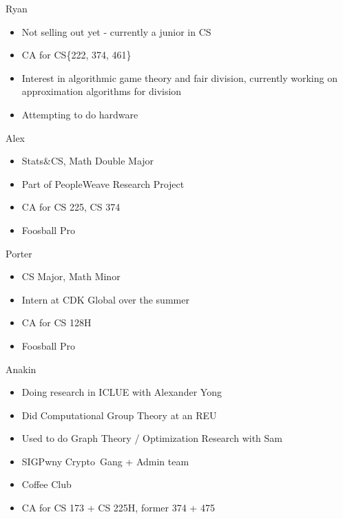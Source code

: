 \documentclass[aspectratio=169]{beamer}
\begin{document}
\begin{frame}{Ryan}
    \begin{itemize}
    \item Not selling out yet - currently a junior in CS
    \item CA for CS\{222, 374, 461\}
    \item Interest in algorithmic game theory and fair division, currently working on approximation algorithms for division
    \item Attempting to do hardware
    \end{itemize} 
\end{frame}

\begin{frame}{Alex}
    \begin{itemize}
    \item Stats\&CS, Math Double Major
    \item Part of PeopleWeave Research Project
    \item CA for CS 225, CS 374
    \item Foosball Pro
    \end{itemize} 
\end{frame}

\begin{frame}{Porter}
    \begin{itemize}
    \item CS Major, Math Minor
    \item Intern at CDK Global over the summer
    \item CA for CS 128H
    \item Foosball Pro
    \end{itemize} 
\end{frame}

\begin{frame}{Anakin} 
        \begin{itemize}
        \item Doing research in ICLUE with Alexander Yong
        \item Did Computational Group Theory at an REU
        \item Used to do Graph Theory / Optimization Research with Sam
        \item SIGPwny Crypto\footnotemark\ Gang + Admin team
        \item Coffee Club
        \item CA for CS 173 + CS 225H, former 374 + 475
    \end{itemize}
\end{frame}
\end{document}
